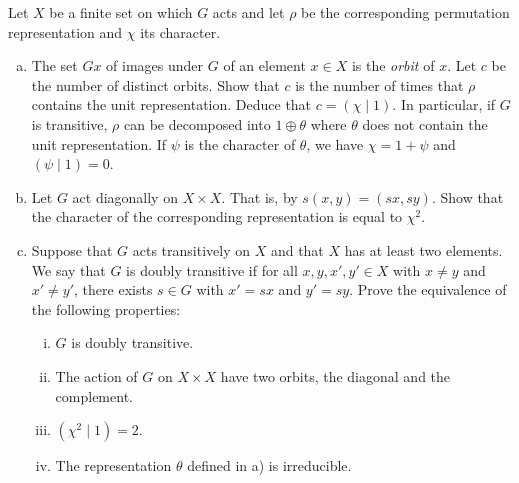 \documentclass[11pt, english]{article}
\begin{document}
\begin{exc}[Exercise 2.6]
Let $X$ be a finite set on which $G$ acts and let $\rho$ be the corresponding permutation representation and $\chi$ its character.
\begin{enumerate}[a)]
\item The set $Gx$ of images under $G$ of an element $x \in X$ is the \emph{orbit} of $x$. Let $c$ be the number of distinct orbits. Show that $c$ is the number of times that $\rho$ contains the unit representation. Deduce that $c=(\chi \mid 1)$. In particular, if $G$ is transitive, $\rho$ can be decomposed into $1 \oplus \theta$ where $\theta$ does not contain the unit representation. If $\psi$ is the character of $\theta$, we have $\chi=1+\psi$ and $(\psi \mid 1)=0$. 
\item Let $G$ act diagonally on $X \times X$. That is, by $s (x,y)= (sx,sy)$. Show that the character of the corresponding representation is equal to $\chi^2$.
\item Suppose that $G$ acts transitively on $X$ and that $X$ has at least two elements. We say that $G$ is doubly transitive if for all $x,y,x',y' \in X$ with $x \neq y$ and $x' \neq y'$, there exists $s \in G$ with $x'=sx$ and $y'=sy$. Prove the equivalence of the following properties:
  \begin{enumerate}[i)]
  \item $G$ is doubly transitive.
\item The action of $G$ on $X \times X$ have two orbits, the diagonal and the complement.
\item $(\chi^2 \mid 1)=2$.
\item The representation $\theta$ defined in a) is irreducible.
  \end{enumerate}
\end{enumerate}
\end{exc}
\end{document}

